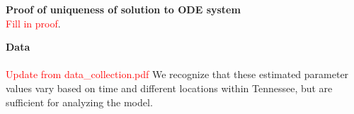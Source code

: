 \documentclass[12pt]{article}
\begin{document}



 \textbf{Proof of uniqueness of solution to ODE system} \\
\textcolor{red}{Fill in proof}. 








\textbf{Data} \\ \\
\textcolor{red}{Update from data\_collection.pdf}
We recognize that these estimated parameter values vary based on time and different locations within Tennessee, but are sufficient for analyzing the model. 
\end{document}
